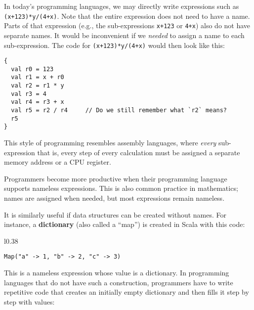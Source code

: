 In today\textsf{'}s programming languages, we may directly write expressions
such as \texttt{}\lstinline!(x+123)*y/(4+x)!. Note that the entire
expression does not need to have a name. Parts of that expression
(e.g., the sub-expressions \texttt{}\lstinline!x+123! or \lstinline!4+x!)
also do not have separate names. It would be inconvenient if we \emph{needed}
to assign a name to each sub-expression. The code for \lstinline!(x+123)*y/(4+x)!
would then look like this:

\begin{lstlisting}
{
  val r0 = 123
  val r1 = x + r0
  val r2 = r1 * y
  val r3 = 4 
  val r4 = r3 + x
  val r5 = r2 / r4     // Do we still remember what `r2` means?
  r5
}
\end{lstlisting}

This style of programming resembles assembly languages,
where \emph{every} sub-expression \textemdash{} that is, every step
of every calculation \textemdash{} must be assigned a separate memory
address or a CPU register.

Programmers become more productive when their programming language
supports nameless expressions. This is also common practice in mathematics;
names are assigned when needed, but most expressions remain nameless.

It is similarly useful if data structures can be created without names.
For instance, a \textbf{dictionary} (also called
a \textsf{``}map\textsf{''}) is created in Scala with this code:

\begin{wrapfigure}{l}{0.38\columnwidth}%
\vspace{-0.8\baselineskip}
\begin{lstlisting}
Map("a" -> 1, "b" -> 2, "c" -> 3)
\end{lstlisting}

\vspace{-1.2\baselineskip}
\end{wrapfigure}%

\noindent This is a nameless expression whose value is a dictionary.
In programming languages that do not have such a construction, programmers
have to write repetitive code that creates an initially empty dictionary
and then fills it step by step with values:

